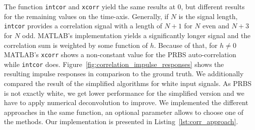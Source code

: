 \documentclass{scrartcl}
\begin{document}
The function \texttt{intcor} and \texttt{xcorr} yield the same results at $0$, but different results for the remaining values on the time-axis.
Generally, if $N$ is the signal length, \texttt{intcor} provides a correlation signal with a length of $N+1$ for $N$ even and $N+3$ for $N$ odd.
MATLAB's implementation yields a significantly longer signal and the correlation sum is weighted by some function of $h$.
Because of that, for $h\neq0$ MATLAB's \texttt{xcorr} shows a non-constant value for the PRBS auto-correlation while \texttt{intcor} does.
Figure~\ref{fig:correlation_impulse_responses} shows the resulting impulse responses in comparison to the ground truth.
We additionally compared the result of the simplified algorithms for white input signals.
As PRBS is not exactly white, we get lower performance for the simplified version and we have to apply numerical deconvolution to improve.
We implemented the different approaches in the same function, an optional parameter allows to choose one of the methods. 
Our implementation is presented in Listing~\ref{lst:corr_approach}.
\end{document}
